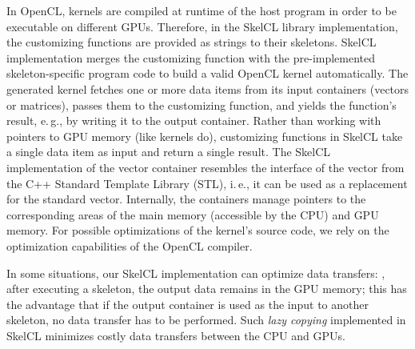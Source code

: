 In OpenCL, kernels are compiled at runtime of the host program in order to be executable on different GPUs.
Therefore, in the SkelCL library implementation, the customizing functions are provided as strings to their skeletons.
SkelCL implementation merges the customizing function with the pre-implemented skeleton-specific program code to build a valid OpenCL kernel automatically.
The generated kernel fetches one or more data items from its input containers (vectors or matrices), passes them to the customizing function, and yields the function's result, e.\,g., by writing it to the output container.
Rather than working with pointers to GPU memory (like kernels do), customizing functions in SkelCL take a single data item as input and return a single result.
The SkelCL implementation of the vector container resembles the interface of the vector from the C++ Standard Template Library (STL), i.\,e., it can be used as a replacement for the standard vector.
Internally, the containers manage pointers to the corresponding areas of the main memory (accessible by the CPU) and GPU memory.
For possible optimizations of the kernel's source code, we rely on the optimization capabilities of the OpenCL compiler.

In some situations, our SkelCL implementation can optimize data transfers:
\eg, after executing a skeleton, the output data remains in the GPU memory;
this has the advantage that if the output container is used as the input to another skeleton, no data transfer has to be performed.
Such \emph{lazy copying} implemented in SkelCL minimizes costly data transfers between the CPU and GPUs.







